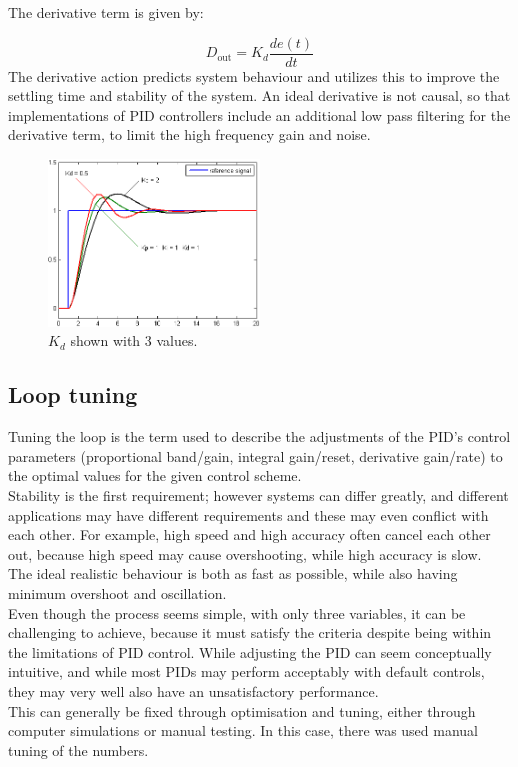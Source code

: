 The derivative term is given by:

$$D_{\mathrm{out}}=K_d\frac{de(t)}{dt}$$
The derivative action predicts system behaviour and utilizes this to improve the settling time and stability of the system.
An ideal derivative is not causal, so that implementations of PID controllers include an additional low pass filtering for the derivative term, to limit the high frequency gain and noise.

\begin{figure}[h!]
  \centering
  \includegraphics[width=0.5\textwidth]{figures/Change_with_Kd.png}
  \caption{$K_d$ shown with 3 values.} 
  \label{PID controller}
\end{figure}



\subsection {Loop tuning} 

Tuning the loop is the term used to describe the adjustments of the PID’s control parameters (proportional band/gain, integral gain/reset, derivative gain/rate) to the optimal values for the given control scheme. \\ Stability is the first requirement; however systems can differ greatly, and different applications may have different requirements and these may even conflict with each other. For example, high speed and high accuracy often cancel each other out, because high speed may cause overshooting, while high accuracy is slow.\\ The ideal realistic behaviour is both as fast as possible, while also having minimum overshoot and oscillation. \\ 

Even though the process seems simple, with only three variables, it can be challenging to achieve, because it must satisfy the criteria despite being within the limitations of PID control. While adjusting the PID can seem conceptually intuitive, and while most PIDs may perform acceptably with default controls, they may very well also have an unsatisfactory performance.\\ This can generally be fixed through optimisation and tuning, either through computer simulations or manual testing. In this case, there was used manual tuning of the numbers.


